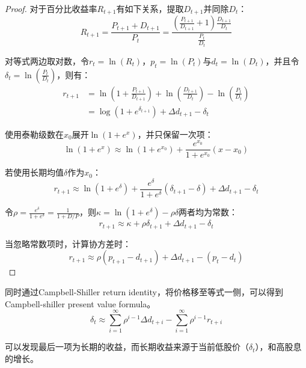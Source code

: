 \documentclass[11pt]{article}
\begin{document}
\begin{appendices}
\begin{proof}
    对于百分比收益率$R_{t+1}$有如下关系，提取$D_{t+1}$并同除$D_{t}$：
    \begin{equation*}
        R_{t+1} = \frac{P_{t+1} + D_{t+1}}{P_t} = \frac{\left( \frac{P_{t+1}}{D_{t+1}} + 1\right) \frac{D_{t+1}}{D_t}}{\frac{P_t}{D_t}}
    \end{equation*}

    对等式两边取对数，令$r_t = \ln(R_t)$，$p_t = \ln(P_t)$与$d_t = \ln(D_t)$，并且令$\delta_t = \ln(\frac{P_t}{D_t})$，则有：
    \begin{align*}
        r_{t+1} &= \ln\left( 1 + \frac{P_{t+1}}{D_{t+1}} \right) + \ln\left( \frac{D_{t+1}}{D_t} \right) - \ln\left( \frac{P_t}{D_t} \right)  \\
        &= \log \left( 1 + e^{\delta_{t+1}} \right) + \Delta d_{t+1} - \delta_t
    \end{align*}

    使用泰勒级数在$x_0$展开$\ln(1+e^x)$，并只保留一次项：
    \begin{equation*}
        \ln(1+e^x) \approx \ln (1+e^{x_0}) + \frac{e^{x_0}}{1+e^{x_0}}(x-x_0)
    \end{equation*}

    若使用长期均值$\delta$作为$x_0$：
    \begin{equation*}
        r_{t+1} \approx \ln(1+e^{\delta}) + \frac{e^{\delta}}{1+ e^{\delta}} (\delta_{t+1} - \delta) + \Delta d_{t+1} - \delta_t
    \end{equation*}
        
    令$\rho = \frac{e^\delta}{1+e^\delta} = \frac{1}{1+D/P}$，则$\kappa = \ln (1+e^\delta) - \rho \delta$两者均为常数：
    \begin{equation*}
        r_{t+1} \approx \kappa + \rho \delta_{t+1} + \Delta d_{t+1} - \delta_t
    \end{equation*}

    当忽略常数项时，计算协方差时：
    \begin{equation*}
        r_{t+1} \approx \rho(p_{t+1} - d_{t+1}) + \Delta d_{t+1} - (p_t - d_t)
    \end{equation*}
\end{proof}

同时通过Campbell-Shiller return identity，将价格移至等式一侧，可以得到Campbell-shiller present value formula。
\begin{equation*}
    \delta_t \approx \sum_{i=1}^{\infty} \rho^{i-1} \Delta d_{t+i} - \sum_{i=1}^{\infty} \rho^{i-1} r_{t+i}
\end{equation*}

可以发现最后一项为长期的收益，而长期收益来源于当前低股价（$\delta_t$），和高股息的增长。

\end{appendices}
\end{document}
